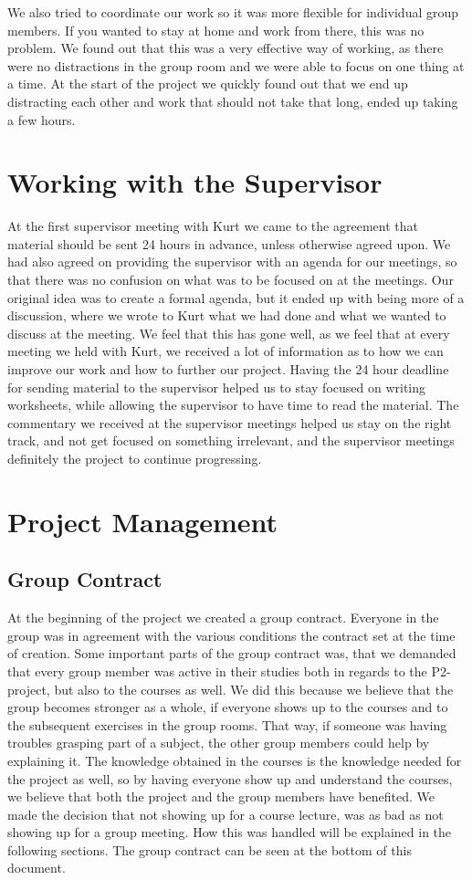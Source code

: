 We also tried to coordinate our work so it was more flexible for individual group members.
If you wanted to stay at home and work from there, this was no problem.
We found out that this was a very effective way of working, as there were no distractions in the group room and we were able to focus on one thing at a time.
At the start of the project we quickly found out that we end up distracting each other and work that should not take that long, ended up taking a few hours.

\section{Working with the Supervisor}
At the first supervisor meeting with Kurt we came to the agreement that material should be sent 24 hours in advance, unless otherwise agreed upon. 
We had also agreed on providing the supervisor with an agenda for our meetings, so that there was no confusion on what was to be focused on at the meetings. 
Our original idea was to create a formal agenda, but it ended up with being more of a discussion, where we wrote to Kurt what we had done and what we wanted to discuss at the meeting. 
We feel that this has gone well, as we feel that at every meeting we held with Kurt, we received a lot of information as to how we can improve our work and how to further our project.
Having the 24 hour deadline for sending material to the supervisor helped us to stay focused on writing worksheets, while allowing the supervisor to have time to read the material. 
The commentary we received at the supervisor meetings helped us stay on the right track, and not get focused on something irrelevant, and the supervisor meetings definitely the project to continue progressing.   

\section{Project Management}
\subsection{Group Contract}
At the beginning of the project we created a group contract. 
Everyone in the group was in agreement with the various conditions the contract set at the time of creation. 
Some important parts of the group contract was, that we demanded that every group member was active in their studies both in regards to the P2-project, but also to the courses as well.
We did this because we believe that the group becomes stronger as a whole, if everyone shows up to the courses and to the subsequent exercises in the group rooms. 
That way, if someone was having troubles grasping part of a subject, the other group members could help by explaining it. 
The knowledge obtained in the courses is the knowledge needed for the project as well, so by having everyone show up and understand the courses, we believe that both the project and the group members have benefited.
We made the decision that not showing up for a course lecture, was as bad as not showing up for a group meeting. How this was handled will be explained in the following sections. 
The group contract can be seen at the bottom of this document.

